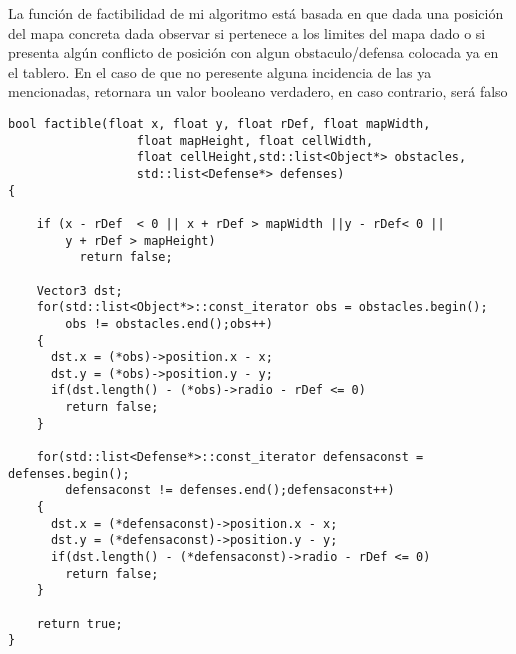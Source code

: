 La función de factibilidad de mi algoritmo está basada en que dada una posición
del mapa concreta dada observar si pertenece a los limites del mapa dado o si
presenta algún conflicto de posición con algun obstaculo/defensa colocada ya en
el tablero. En el caso de que no peresente alguna incidencia de las ya
mencionadas, retornara un valor booleano verdadero, en caso contrario, será
falso

\begin{lstlisting}
bool factible(float x, float y, float rDef, float mapWidth,
                  float mapHeight, float cellWidth,
                  float cellHeight,std::list<Object*> obstacles,
                  std::list<Defense*> defenses)
{

    if (x - rDef  < 0 || x + rDef > mapWidth ||y - rDef< 0 ||
        y + rDef > mapHeight)
          return false;

    Vector3 dst;
    for(std::list<Object*>::const_iterator obs = obstacles.begin();
        obs != obstacles.end();obs++)
    {
      dst.x = (*obs)->position.x - x;
      dst.y = (*obs)->position.y - y;
      if(dst.length() - (*obs)->radio - rDef <= 0)
        return false;
    }

    for(std::list<Defense*>::const_iterator defensaconst = defenses.begin();
        defensaconst != defenses.end();defensaconst++)
    {
      dst.x = (*defensaconst)->position.x - x;
      dst.y = (*defensaconst)->position.y - y;
      if(dst.length() - (*defensaconst)->radio - rDef <= 0)
        return false;
    }

    return true;
}
\end{lstlisting}
